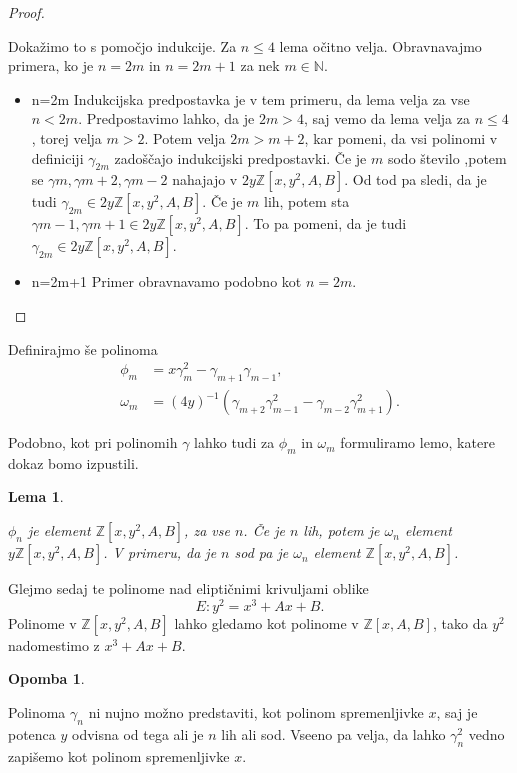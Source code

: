 \documentclass[12pt,a4paper,twoside]{article}
\theoremstyle{definition} %
\newtheorem{opomba}[definicija]{Opomba}
\theoremstyle{plain} %
\newtheorem{lema}[definicija]{Lema}
\numberwithin{equation}{section}  %
\newcommand{\N}{\mathbb N}
\newcommand{\Z}{\mathbb Z}
\begin{document}
\begin{proof}~

Dokažimo to s pomočjo indukcije. Za $n \leq 4$ lema očitno velja. Obravnavajmo primera, ko je $n=2m$ in  $n=2m+1$ za nek $m\in\N$.
\begin{itemize}
\item{n=2m}
Indukcijska predpostavka je v tem primeru, da lema velja za vse $n<2m$.
Predpostavimo lahko, da je $2m>4$, saj vemo da lema velja za $n\leq 4$, torej velja $m>2$. Potem velja $2m>m+2$, kar pomeni, da vsi polinomi v definiciji $\gamma_{2m}$ zadoščajo indukcijski predpostavki. Če je $m$ sodo število ,potem se $\gamma{m},\gamma{m+2},\gamma{m-2}$ nahajajo v $2y\Z[x,y^2,A,B]$. Od tod pa sledi, da je tudi $\gamma_{2m} \in 2y\Z[x,y^2,A,B]$.
Če je $m$ lih, potem sta $\gamma{m-1},\gamma{m+1} \in 2y\Z[x,y^2,A,B]$. To pa pomeni, da je tudi  $\gamma_{2m} \in 2y\Z[x,y^2,A,B]$.
\item{n=2m+1}
Primer obravnavamo podobno kot $n=2m$.


\end{itemize}


\end{proof}

Definirajmo še polinoma
\begin{align}
\phi_m &{}=x\gamma^2_m-\gamma_{m+1}\gamma_{m-1}, \nonumber \\
\omega_m &{} = (4y)^{-1}(\gamma_{m+2}\gamma^2_{m-1}-\gamma_{m-2}\gamma^2_{m+1}). \nonumber
\end{align}

Podobno, kot pri polinomih $\gamma$ lahko tudi za $\phi_m$ in $\omega_m$ formuliramo lemo, katere dokaz bomo izpustili.

\begin{lema}~

$\phi_{n}$ je element $\Z[x,y^2,A,B]$, za vse $n$. Če je $n$ lih, potem je $\omega_{n}$ element \newline $y\Z[x,y^2,A,B]$. V primeru, da je $n$ sod pa je $\omega_{n}$ element $\Z[x,y^2,A,B]$.

\end{lema}

Glejmo sedaj te polinome nad eliptičnimi krivuljami oblike
$$E: y^2=x^3+Ax+B.$$
Polinome v $\Z[x,y^2,A,B]$ lahko gledamo kot polinome v $\Z[x,A,B]$, tako da $y^2$ nadomestimo z $x^3+Ax+B$.
\begin{opomba}~

Polinoma $\gamma_n$ ni nujno možno predstaviti, kot polinom spremenljivke $x$, saj je potenca $y$ odvisna od tega ali je $n$ lih ali sod. Vseeno pa velja, da lahko $\gamma^2_n$ vedno zapišemo kot polinom spremenljivke $x$.

\end{opomba}
\end{document}
